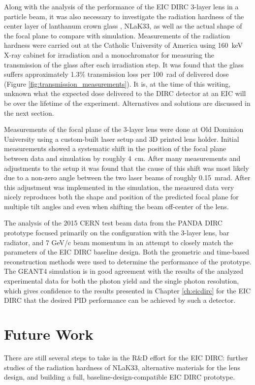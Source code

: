 Along with the analysis of the performance of the EIC DIRC 3-layer lens in a particle beam, it was also necessary to investigate the radiation hardness of the center layer of lanthanum crown glass \cite{SchottData}, NLaK33, as well as the actual shape of the focal plane to compare with simulation. Measurements of the radiation hardness were carried out at the Catholic University of America using  160~keV X-ray cabinet \cite{XRayCabinet} for irradiation and a monochromator \cite{Monochromator} for measuring the transmission of the glass after each irradiation step. It was found that the glass suffers approximately 1.3\% transmission loss per 100~rad of delivered dose (Figure \ref{fig:transmission_measurements}). It is, at the time of this writing, unknown what the expected dose delivered to the DIRC detector at an EIC will be over the lifetime of the experiment. Alternatives and solutions are discussed in the next section.

Measurements of the focal plane of the 3-layer lens were done at Old Dominion University using a custom-built laser setup and 3D printed lens holder. Initial measurements showed a systematic shift in the position of the focal plane between data and simulation by roughly 4~cm. After many measurements and adjustments to the setup it was found that the cause of this shift was most likely due to a non-zero angle between the two laser beams of roughly 0.15~mrad. After this adjustment was implemented in the simulation, the measured data very nicely reproduces both the shape and position of the predicted focal plane for multiple tilt angles and even when shifting the beam off-center of the lens.

The analysis of the 2015 CERN test beam data from the PANDA DIRC prototype focused primarily on the configuration with the 3-layer lens, bar radiator, and 7 GeV/c beam momentum in an attempt to closely match the parameters of the EIC DIRC baseline design. Both the geometric and time-based reconstruction methods were used to determine the performance of the prototype. The GEANT4 simulation is in good agreement with the results of the analyzed experimental data for both the photon yield and the single photon resolution, which gives confidence to the results presented in Chapter \ref{ch:eicdirc} for the EIC DIRC that the desired PID performance can be achieved by such a detector. 

\section{Future Work}
There are still several steps to take in the R\&D effort for the EIC DIRC: further studies of the radiation hardness of NLaK33, alternative materials for the lens design, and building a full, baseline-design-compatible EIC DIRC prototype.


